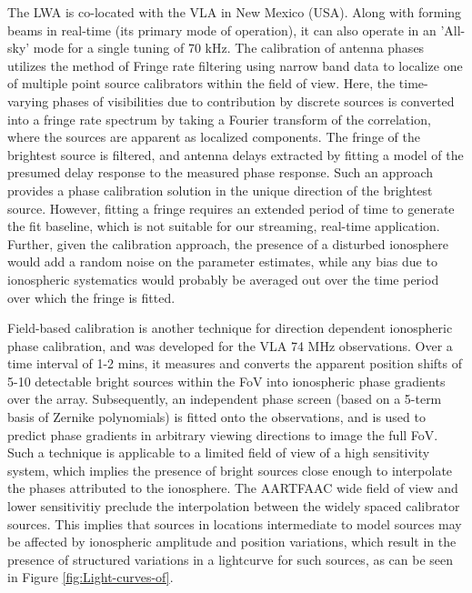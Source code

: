 \documentclass{aa}
\begin{document}
The  LWA\citep{ellingsonLWA1}   is  co-located  with  the  VLA   in  New  Mexico
(USA). Along with forming beams in real-time (its primary mode of operation), it
can  also operate  in an  'All-sky' mode  for  a single  tuning of  70 kHz.  The
calibration of antenna phases utilizes the method of Fringe rate filtering using
narrow band data to localize one of multiple point source calibrators within the
field of view. Here, the time-varying phases of visibilities due to contribution
by discrete sources is converted into a fringe rate spectrum by taking a Fourier
transform  of the  correlation,  where  the sources  are  apparent as  localized
components. The fringe  of the brightest source is  filtered, and antenna delays
extracted by  fitting a  model of  the presumed delay  response to  the measured
phase response.  Such an approach provides  a phase calibration  solution in the
unique direction of the brightest source.  However, fitting a fringe requires an
extended period of time to generate  the fit baseline, which is not suitable for
our streaming, real-time application.  Further, given the calibration approach,
the presence of a disturbed ionosphere would add a random noise on the parameter
estimates,  while any  bias due  to  ionospheric systematics  would probably  be
averaged out over the time period over which the fringe is fitted.

Field-based   calibration\citep{cottona2004beyond}  is  another   technique  for
direction dependent ionospheric phase calibration, and was developed for the VLA
74 MHz observations. Over a time  interval of 1-2 mins, it measures and converts
the apparent  position shifts of 5-10  detectable bright sources  within the FoV
into ionospheric  phase gradients over  the array. Subsequently,  an independent
phase screen (based on a 5-term basis of Zernike polynomials) is fitted onto the
observations,  and is  used  to  predict phase  gradients  in arbitrary  viewing
directions to  image the full FoV. Such  a technique is applicable  to a limited
field of view of a high sensitivity system, which implies the presence of bright
sources close enough to interpolate the phases attributed to the ionosphere. The
AARTFAAC wide  field of view  and lower sensitivitiy preclude  the interpolation
between  the widely  spaced calibrator  sources.  This implies  that sources  in
locations intermediate to model sources may be affected by ionospheric amplitude
and position variations,  which result in the presence  of structured variations
in   a   lightcurve   for   such   sources,   as   can   be   seen   in   Figure
\ref{fig:Light-curves-of}.
\end{document}
